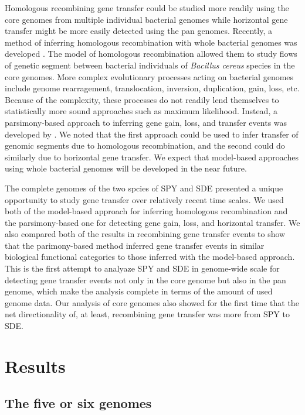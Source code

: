 \documentclass[english]{article}
\begin{document}
Homologous recombining gene transfer could be studied more readily using the
core genomes from multiple individual bacterial genomes while horizontal gene
transfer might be more easily detected using the pan genomes. Recently, a method
of inferring homologous recombination with whole bacterial genomes was developed
\citep{Didelot2010}. The model of homologous recombination allowed them to study
flows of genetic segment between bacterial individuals of \textit{Bacillus
cereus} species in the core genomes.  More complex evolutionary processes acting
on bacterial genomes include genome rearragement, translocation, inversion,
duplication, gain, loss, etc.  Because of the complexity, these processes do not
readily lend themselves to statistically more sound approaches such as maximum
likelihood. Instead, a parsimony-based approach to inferring gene gain, loss,
and transfer events was developed by  \citep{Doyon2011}.  We noted that the
first approach could be used to infer transfer of genomic segments due to
homologous recombination, and the second could do similarly due to horizontal
gene transfer. We expect that model-based approaches using whole bacterial
genomes will be developed in the near future.

The complete genomes of the two spcies of SPY and SDE presented a unique
opportunity to study gene transfer over relatively recent time scales.  We used
both of the model-based approach for inferring homologous recombination and the
parsimony-based one for detecting gene gain, loss, and horizontal transfer. We
also compared both of the results in recombining gene transfer events to show
that the parimony-based method inferred gene transfer events in similar
biological functional categories to those inferred with the model-based
approach. This is the first attempt to analyaze SPY and SDE in genome-wide scale
for detecting gene transfer events not only in the core genome but also in the
pan genome, which make the analysis complete in terms of the amount of used
genome data. Our analysis of core genomes also showed for the first time that
the net directionality of, at least, recombining gene transfer was more from SPY
to SDE.

\clearpage{}

\section{Results}

\subsection{The five or six genomes}
\end{document}

